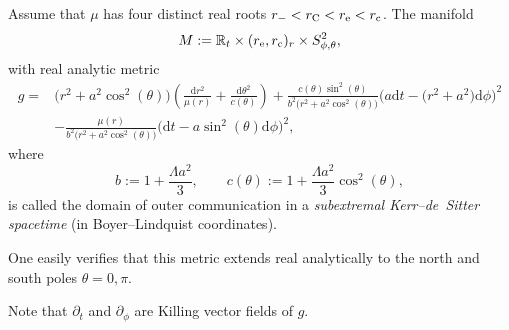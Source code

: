 \documentclass[pdftex]{sigma}
\renewcommand{\d}{\partial}
\newcommand{\md}{\mathrm d}
\newcommand{\R}[0]{\mathbb{R}}
\numberwithin{equation}{section}
\begin{document}
\begin{Definition} \label{def: BL metric}
Assume that $\mu$ has four distinct real roots $r_- < r_{\rm C} < r_{\rm e} < r_{\rm c}$. The manifold
\[
	M := \R_t \times (r_{\rm e}, r_{\rm c})_r \times S^2_{\phi, \theta},
\]
with real analytic metric
\begin{align*}
	g
		={}& \big(r^2 + a^2 \cos^2(\theta)\big)\left( \frac{\md r^2}{\mu(r)} + \frac{\md \theta^2}{c(\theta)}\right) + \frac{c(\theta)\sin^2(\theta)}{b^2\big(r^2 + a^2 \cos^2(\theta)\big)}\big(a \md t - \big(r^2 + a^2\big)\md \phi\big)^2 \\
		& - \frac{\mu(r)}{b^2\big(r^2 + a^2 \cos^2(\theta)\big)}\big(\md t - a \sin^2(\theta)\md \phi\big)^2,
\end{align*}
where
\[
	b := 1 + \frac{\Lambda a^2}3, \qquad c(\theta) := 1 + \frac{\Lambda a^2}3 \cos^2(\theta),
\]
is called the domain of outer communication in a \emph{subextremal Kerr--de~Sitter spacetime} (in Boyer--Lindquist coordinates).
\end{Definition}
One easily verifies that this metric extends real analytically to the north and south poles $\theta = 0, \pi$.

\begin{Remark}
Note that $\d_t$ and $\d_\phi$ are Killing vector fields of $g$.
\end{Remark}
\end{document}
